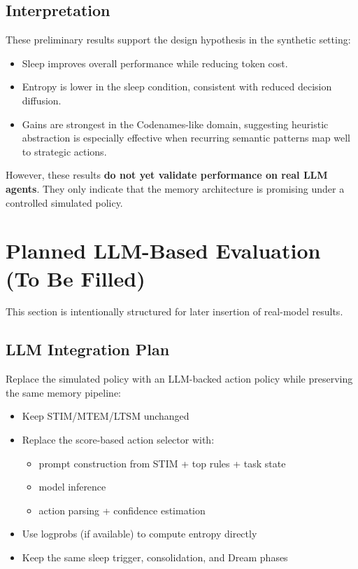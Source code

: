 \documentclass{article}
\begin{document}
\subsection{Interpretation}

These preliminary results support the design hypothesis in the synthetic setting:

\begin{itemize}[leftmargin=1.25em]
\item Sleep improves overall performance while reducing token cost.
\item Entropy is lower in the sleep condition, consistent with reduced decision diffusion.
\item Gains are strongest in the Codenames-like domain, suggesting heuristic abstraction is especially effective when recurring semantic patterns map well to strategic actions.
\end{itemize}

However, these results \textbf{do not yet validate performance on real LLM agents}. They only indicate that the memory architecture is promising under a controlled simulated policy.

\section{Planned LLM-Based Evaluation (To Be Filled)}

This section is intentionally structured for later insertion of real-model results.

\subsection{LLM Integration Plan}

Replace the simulated policy with an LLM-backed action policy while preserving the same memory pipeline:

\begin{itemize}[leftmargin=1.25em]
\item Keep STIM/MTEM/LTSM unchanged
\item Replace the score-based action selector with:
  \begin{itemize}[leftmargin=1.25em]
  \item prompt construction from STIM + top rules + task state
  \item model inference
  \item action parsing + confidence estimation
  \end{itemize}
\item Use logprobs (if available) to compute entropy directly
\item Keep the same sleep trigger, consolidation, and Dream phases
\end{itemize}
\end{document}

